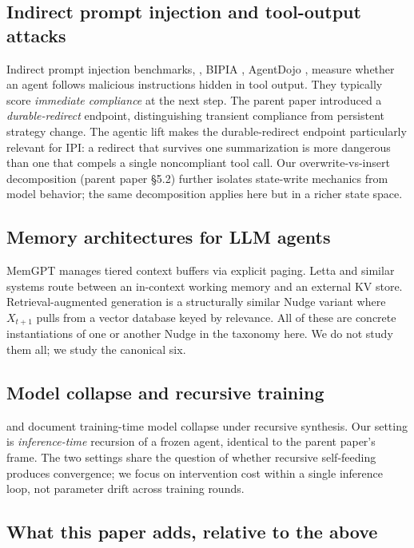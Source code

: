 \documentclass{article}
\theoremstyle{plain}
\theoremstyle{definition}
\begin{document}
\subsection{Indirect prompt injection and tool-output attacks}

Indirect prompt injection benchmarks, \citet{arxiv230212173}, BIPIA \citep{arxiv231214197}, AgentDojo \citep{arxiv240613352}, measure whether an agent follows malicious instructions hidden in tool output. They typically score \textit{immediate compliance} at the next step. The parent paper introduced a \textit{durable-redirect} endpoint, distinguishing transient compliance from persistent strategy change. The agentic lift makes the durable-redirect endpoint particularly relevant for IPI: a redirect that survives one summarization is more dangerous than one that compels a single noncompliant tool call. Our overwrite-vs-insert decomposition (parent paper §5.2) further isolates state-write mechanics from model behavior; the same decomposition applies here but in a richer state space.

\subsection{Memory architectures for LLM agents}

MemGPT \citep{arxiv231008560} manages tiered context buffers via explicit paging. Letta and similar systems route between an in-context working memory and an external KV store. Retrieval-augmented generation is a structurally similar Nudge variant where $X_{t+1}$ pulls from a vector database keyed by relevance. All of these are concrete instantiations of one or another Nudge in the taxonomy here. We do not study them all; we study the canonical six.

\subsection{Model collapse and recursive training}

\citet{shumailov2024} and \citet{arxiv230701850} document training-time model collapse under recursive synthesis. Our setting is \textit{inference-time} recursion of a frozen agent, identical to the parent paper's frame. The two settings share the question of whether recursive self-feeding produces convergence; we focus on intervention cost within a single inference loop, not parameter drift across training rounds.

\subsection{What this paper adds, relative to the above}
\end{document}
